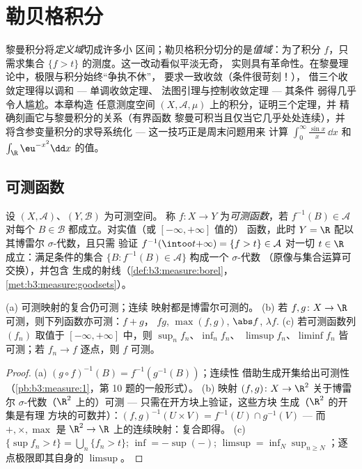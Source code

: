 \chapter{勒贝格积分}\label{ch:b3:lebesgue}

黎曼积分将\emph{定义域}切成许多小
区间；勒贝格积分切分的是\emph{值域}：为了积分
$f$，只需求集合 $\{f > t\}$ 的测度。这一改动看似平淡无奇，
实则具有革命性。在黎曼理论中，极限与积分始终“争执不休”，
要求一致收敛（条件很苛刻！），
借三个收敛定理得以调和 --- 单调收敛定理、
法图引理与控制收敛定理 --- 其条件
弱得几乎令人尴尬。本章构造
任意测度空间 $(X, \mathcal A,
\mu)$ 上的积分，证明三个定理，并
精确刻画它与黎曼积分的关系（有界函数
黎曼可积当且仅当它几乎处处连续），并
将含参变量积分的求导系统化 ---
这一技巧正是周末问题用来
计算 $\int_0^\infty\frac{\sin x}x\,\dd x$ 和
$\int_\R \eu^{-x^2}\dd x$ 的值。

\section{可测函数}

\begin{definition}\label{def:b3:lebesgue:measurable}
设 $(X, \mathcal A)$、$(Y, \mathcal B)$ 为可测空间。
称 $f \colon X \to Y$ 为\emph{可测函数}，若 $f^{-1}(B) \in \mathcal A$ 对每个 $B \in
\mathcal B$ 都成立。对实值（或 $[-\infty,+\infty]$ 值的）
函数，此时 $Y = \R$ 配以其博雷尔 $\sigma$-代数，且只需
验证 $f^{-1}(\intoo t{+\infty}) = \{f > t\} \in
\mathcal A$ 对一切 $t \in \R$ 成立：满足条件的集合 $\{B :
f^{-1}(B) \in \mathcal A\}$ 构成一个 $\sigma$-代数
（原像与集合运算可交换），并包含
生成的射线（\cref{def:b3:measure:borel}，
\cref{met:b3:measure:goodsets}）。
\end{definition}

\begin{proposition}\label{prop:b3:lebesgue:stability}
(a) 可测映射的复合仍可测；连续
映射都是博雷尔可测的。
(b) 若 $f, g \colon X \to \R$ 可测，则下列函数亦可测：$f + g$，
$fg$, $\max(f,g)$, $\abs f$, $\lambda f$.
(c) 若可测函数列 $(f_n)$ 取值于
$[-\infty, +\infty]$ 中，则 $\sup_nf_n$、$\inf_nf_n$、
$\limsup f_n$、$\liminf f_n$ 皆可测；若 $f_n \to f$
逐点，则 $f$ 可测。
\end{proposition}

\begin{proof}
(a) $(g\circ f)^{-1}(B) = f^{-1}(g^{-1}(B))$；连续性
借助生成开集给出可测性
（\cref{pb:b3:measure:1}，第 10 题的一般形式）。
(b) 映射 $(f, g) \colon X \to \R^2$ 关于博雷尔
$\sigma$-代数（$\R^2$ 上的）可测 --- 只需在开方块上验证，这些方块
生成（$\R^2$ 的开集是有理
方块的可数并）：$(f,g)^{-1}(U\times V) = f^{-1}(U)\cap g^{-1}(V)$ ---
而 $+, \times, \max$ 是 $\R^2 \to \R$ 上的连续映射：复合即得。
(c) $\{\sup f_n > t\} = \bigcup_n\{f_n > t\}$; $\inf = -\sup(-)$;
$\limsup = \inf_N\sup_{n \geq N}$；逐点极限即其自身的
$\limsup$。
\end{proof}

